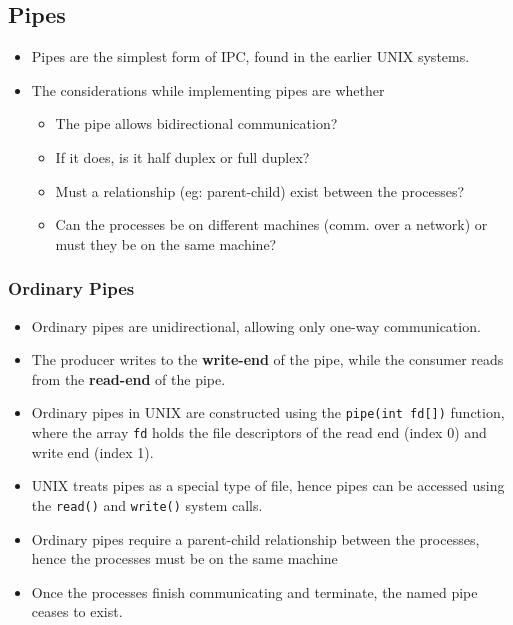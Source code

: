\documentclass{article}
\theoremstyle{plain}
\theoremstyle{definition}
\begin{document}
\subsection{Pipes}
\begin{itemize}
    \item Pipes are the simplest form of IPC, found in the earlier UNIX systems.
    
    \item The considerations while implementing pipes are whether
    \begin{itemize}
        \item The pipe allows bidirectional communication?
        
        \item If it does, is it half duplex or full duplex?
        
        \item Must a relationship (eg: parent-child) exist between the processes?
        
        \item Can the processes be on different machines (comm. over  a network) or must they be on the same machine?
    \end{itemize}
\end{itemize}

\subsubsection{Ordinary Pipes}
\begin{itemize}
    \item Ordinary pipes are unidirectional, allowing only one-way communication.
    
    \item The producer writes to the \textbf{write-end} of the pipe, while the consumer reads from the \textbf{read-end} of the pipe. 
    
    \item Ordinary pipes in UNIX are constructed using the \texttt{pipe(int fd[])} function, where the array \texttt{fd} holds the file descriptors of the read end (index 0) and write end (index 1).
    
    \item UNIX treats pipes as a special type of file, hence pipes can be accessed using the \texttt{read()} and \texttt{write()} system calls.
    
    \item Ordinary pipes require a parent-child relationship between the processes, hence the processes must be on the same machine
    
    \item Once the processes finish communicating and terminate, the named pipe ceases to exist.
\end{itemize}
\end{document}
